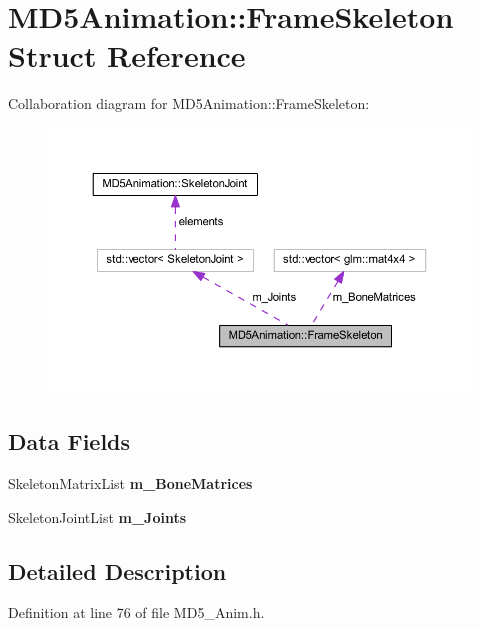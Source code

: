 \hypertarget{struct_m_d5_animation_1_1_frame_skeleton}{}\section{M\+D5\+Animation\+:\+:Frame\+Skeleton Struct Reference}
\label{struct_m_d5_animation_1_1_frame_skeleton}


Collaboration diagram for M\+D5\+Animation\+:\+:Frame\+Skeleton\+:
\nopagebreak
\begin{figure}[H]
\begin{center}
\leavevmode
\includegraphics[width=350pt]{struct_m_d5_animation_1_1_frame_skeleton__coll__graph}
\end{center}
\end{figure}
\subsection*{Data Fields}
\begin{DoxyCompactItemize}
\item 
Skeleton\+Matrix\+List {\bfseries m\+\_\+\+Bone\+Matrices}\hypertarget{struct_m_d5_animation_1_1_frame_skeleton_a614fe6f4ce905af6da3cb6f6f3a7a5cd}{}\label{struct_m_d5_animation_1_1_frame_skeleton_a614fe6f4ce905af6da3cb6f6f3a7a5cd}

\item 
Skeleton\+Joint\+List {\bfseries m\+\_\+\+Joints}\hypertarget{struct_m_d5_animation_1_1_frame_skeleton_a65ce440d467eaae6c3cbbf94eb1d91b9}{}\label{struct_m_d5_animation_1_1_frame_skeleton_a65ce440d467eaae6c3cbbf94eb1d91b9}

\end{DoxyCompactItemize}


\subsection{Detailed Description}


Definition at line 76 of file M\+D5\+\_\+\+Anim.\+h.

